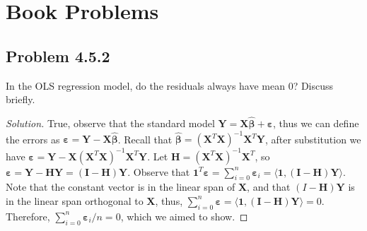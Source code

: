 \documentclass{amsart}\usepackage[]{graphicx}\usepackage[]{color}
\newcommand{\ep}{\varepsilon}
\newcommand{\bvec}[1]{{\boldsymbol #1}}
\newcommand{\bbeta}{\bvec{\beta}}
\newcommand{\bX}{\bvec{X}}
\newcommand{\bY}{\bvec{Y}}
\begin{document}
\section{Book Problems} %
	\label{sec:book_problems}
		\subsection*{Problem 4.5.2} %
		\label{ssub:problem_4_5_2}
		In the OLS regression model, do the residuals always have mean 0?
		Discuss briefly.
			\begin{proof}[Solution]
				True, observe that the standard model $\bY = \bX \hat{\bbeta} + \bvec{\ep}$, thus we can define the errors as $\bvec{\ep} = \bY-\bX \hat{\bbeta}$.
				Recall that $\hat{\bbeta}=(\bX^{T}\bX)^{-1}\bX^{T}\bY$, after substitution we have $\bvec{\ep} = \bY-\bX(\bX^{T}\bX)^{-1}\bX^{T}\bY$.
				Let $\bvec{H} = (\bX^{T}\bX)^{-1}\bX^{T}$, so $\bvec{\ep} = \bY- \bvec{H} \bY = (\bvec{I}-\bvec{H})\bY$.
				Observe that $\bvec{1}^{T}\bvec{\ep} = \sum_{i=0}^{n}{\bvec{\ep}_{i}} = \langle \bvec{1}, (\bvec{I}-\bvec{H})\bY \rangle$.
				Note that the constant vector is in the linear span of $\bvec{X}$, and that $(I-\bvec{H})\bY$ is in the linear span orthogonal to $\bX$, thus,  $\sum_{i=0}^{n}{\bvec{\ep}} = \langle \bvec{1}, (\bvec{I}-\bvec{H})\bY \rangle =0$. Therefore, $\sum_{i=0}^{n} \bvec{\ep}_{i}/n = 0$, which we aimed to show.
			\end{proof}
\end{document}

